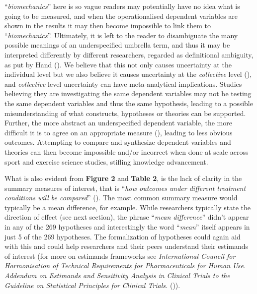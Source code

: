 \documentclass[
]{article}
\begin{document}
``\emph{biomechanics}'' here is so vague readers may potentially have no
idea what is going to be measured, and when the operationalised
dependent variables are shown in the results it may then become
impossible to link them to ``\emph{biomechanics}''. Ultimately, it is
left to the reader to disambiguate the many possible meanings of an
underspecified umbrella term, and thus it may be interpreted differently
by different researchers, regarded as definitional ambiguity, as put by
Hand (). We believe that
this not only causes uncertainty at the individual level but we also
believe it causes uncertainty at the \emph{collective} level
(), and
\emph{collective} level uncertainty can have meta-analytical
implications. Studies believing they are investigating the same
dependent variables may not be testing the same dependent variables and
thus the same hypothesis, leading to a possible misunderstanding of what
constructs, hypotheses or theories can be supported. Further, the more
abstract an underspecified dependent variable, the more difficult it is
to agree on an appropriate measure
(), leading
to less obvious outcomes. Attempting to compare and synthesize dependent
variables and theories can then become impossible and/or incorrect when
done at scale across sport and exercise science studies, stifling
knowledge advancement.

What is also evident from \textbf{Figure 2} and \textbf{Table 2}, is the
lack of clarity in the summary measures of interest, that is ``\emph{how
outcomes under different treatment conditions will be compared}''
(). The most
common summary measure would typically be a mean difference, for
example. While researchers typically state the direction of effect (see
next section), the phrase ``\emph{mean difference}'' didn't appear in
any of the 269 hypotheses and interestingly the word ``\emph{mean}''
itself appears in just 5 of the 269 hypotheses. The formalization of
hypotheses could again aid with this and could help researchers and
their peers understand their estimands of interest (for more on
estimands frameworks see \emph{International Council for Harmonisation
of Technical Requirements for Pharmaceuticals for Human Use. Addendum on
Estimands and Sensitivity Analysis in Clinical Trials to the Guideline
on Statistical Principles for Clinical Trials.}
()).
\end{document}

